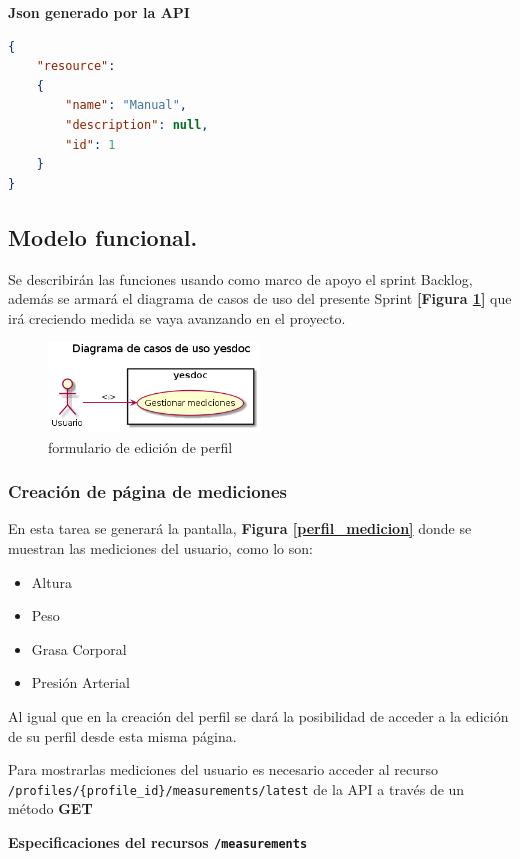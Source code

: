 \documentclass[a4paper,12pt]{article}
\begin{document}
    \textbf{Json generado por la API} 
    \begin{lstlisting}[language=json,firstnumber=1]
{
    "resource": 
    {
        "name": "Manual",
        "description": null,
        "id": 1
    }
}
    \end{lstlisting}
    
\subsection{ Modelo funcional.} %
Se describirán las funciones usando como marco de apoyo el sprint Backlog, además se armará el diagrama de casos de uso del presente Sprint \textbf{[Figura \ref{2-caso_de_uso}]} que irá creciendo  medida se vaya avanzando en el proyecto.
    \begin{figure}[h]
        \centering
        \includegraphics[width=0.5\textwidth]{img/2-caso_de_uso}
        \caption{formulario de edición de perfil}
		\label{2-caso_de_uso}
    \end{figure}

    
\subsubsection{Creación de página de mediciones}
En esta tarea  se generará la pantalla, \textbf{Figura \ref{perfil_medicion}} donde se muestran las mediciones del usuario, como lo son:
      \begin{itemize}
	      \item Altura
          \item Peso
          \item Grasa Corporal
          \item Presión Arterial
      \end{itemize}
      Al igual que en la creación del perfil se dará la posibilidad de acceder a la edición de su perfil desde esta misma página.
      
Para mostrarlas mediciones del usuario es necesario acceder al recurso \texttt{/profiles/\{profile\_id\}/measurements/latest} de la API a través de un método \textbf{GET}


      \textbf{Especificaciones del recursos \texttt{/measurements}}
\end{document}
